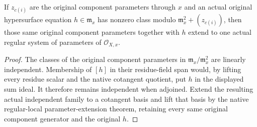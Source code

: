 \begin{lemma}
\label{lem:kn-nadel-bertini-snc-transverse-local}
\leanok
If $z_{c(i)}$ are the original component parameters through $x$ and an
actual original hypersurface equation $h\in\mathfrak m_x$ has nonzero
class modulo $\mathfrak m_x^2+(z_{c(i)})$, then those same original
component parameters together with $h$ extend to one actual regular
system of parameters of $\mathcal O_{X,x}$.
\end{lemma}
\begin{proof}
The classes of the original component parameters in
$\mathfrak m_x/\mathfrak m_x^2$ are linearly independent.  Membership of
$[h]$ in their residue-field span would, by lifting every residue scalar
and the native cotangent quotient, put $h$ in the displayed sum ideal.
It therefore remains independent when adjoined.  Extend the resulting
actual independent family to a cotangent basis and lift that basis by
the native regular-local parameter-extension theorem, retaining every
same original component generator and the original $h$.
\end{proof}


